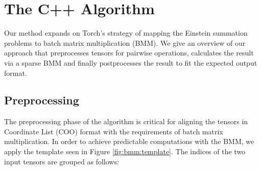\section{The C++ Algorithm}
Our method expands on Torch's strategy of mapping the Einstein summation problems to batch matrix
multiplication (BMM). We give an overview of our approach that preprocesses tensors for pairwise
operations, calculates the result via a sparse BMM and finally postprocesses the result to fit the
expected output format.

\subsection{Preprocessing}
The preprocessing phase of the algorithm is critical for aligning the tensors in Coordinate List
(COO) format with the requirements of batch matrix multiplication. In order to achieve predictable
computations with the BMM, we apply the template seen in Figure \ref{fig:bmm:template}. The indices
of the two input tensors are grouped as follows:

